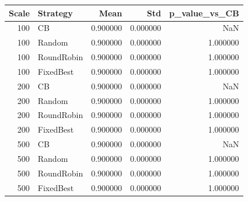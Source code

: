 \begin{tabular}{rlrrr}
\toprule
Scale & Strategy & Mean & Std & p_value_vs_CB \\
\midrule
100 & CB & 0.900000 & 0.000000 & NaN \\
100 & Random & 0.900000 & 0.000000 & 1.000000 \\
100 & RoundRobin & 0.900000 & 0.000000 & 1.000000 \\
100 & FixedBest & 0.900000 & 0.000000 & 1.000000 \\
200 & CB & 0.900000 & 0.000000 & NaN \\
200 & Random & 0.900000 & 0.000000 & 1.000000 \\
200 & RoundRobin & 0.900000 & 0.000000 & 1.000000 \\
200 & FixedBest & 0.900000 & 0.000000 & 1.000000 \\
500 & CB & 0.900000 & 0.000000 & NaN \\
500 & Random & 0.900000 & 0.000000 & 1.000000 \\
500 & RoundRobin & 0.900000 & 0.000000 & 1.000000 \\
500 & FixedBest & 0.900000 & 0.000000 & 1.000000 \\
\bottomrule
\end{tabular}
